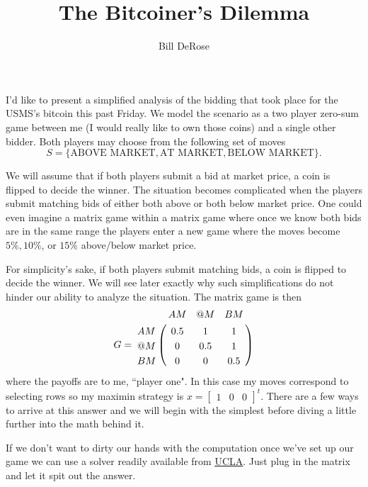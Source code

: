 \documentclass[11pt, oneside]{article}     %
\title{The Bitcoiner's Dilemma}
\author{Bill DeRose}
\begin{document}

\maketitle
I'd like to present a simplified analysis of the bidding that took place for the 
USMS's bitcoin this past Friday. We model the scenario as a two player
zero-sum game between me (I would really like to own those coins) 
and a single other bidder. Both players may choose from the following set of 
moves $$S =\{\mbox{ABOVE MARKET}, \mbox{AT MARKET}, \mbox{BELOW MARKET}\}.$$

We will assume that if both players submit a bid at market price, a coin
is flipped to decide the winner. The situation becomes complicated when the 
players submit matching bids of either both above or both below market price.
One could even imagine a matrix game within a matrix
game where once we know both bids are in the same range the players enter a new
game where the moves become $5\%, 10\%$, or $15\%$ above/below market price.


For simplicity's sake, if both players submit matching bids, a coin
is flipped to decide the winner. We will see later exactly why
such simplifications do not hinder our ability to analyze the situation.
The matrix game is then 
\begin{align*}
G = \bordermatrix{
      &   AM & @M & BM\cr
      AM & 0.5 & 1 & 1\cr
    	@M & 0 & 0.5 & 1\cr
			BM & 0 & 0 & 0.5\cr}
\end{align*}
where the payoffs are to me, ``player one". In this case my moves correspond to 
selecting rows so 
my maximin strategy is $x = \begin{bmatrix}1 & 0 & 0 \end{bmatrix}^t$. 
There are a few ways to arrive at this answer and we will begin with
the simplest before diving a little further into the math behind it.


If we don't want to dirty our hands with the computation once we've set
up our game we can use a solver readily available from
\href{http://www.math.ucla.edu/~tom/gamesolve.html}{\uline{UCLA}}. Just plug in the
matrix and let it spit out the answer.
\end{document}
